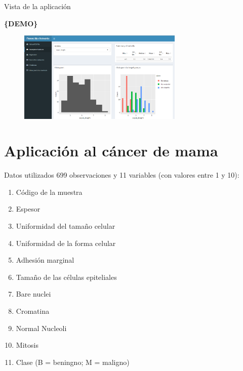 \documentclass[hyperref={unicode}]{beamer}
\begin{document}
\begin{frame}{Vista de la aplicación}
	\begin{center}
	\Huge \color{ExecusharesBlue}\textbf{\{DEMO\}}
	\end{center}
	\begin{figure}[htbp!]
		\centering
		\href{https://parencliticnetworks.shinyapps.io/ParencliticsNetworks}{\includegraphics[width=0.7\textwidth]{../memoria/imagenes/descriptiva.png}}
		\label{fig:aplicacion}
	\end{figure}
\end{frame}



\section{Aplicación al cáncer de mama}
\begin{frame}{Datos utilizados}
	699 observaciones y 11 variables (con valores entre 1 y 10):
	\begin{enumerate}
		\item Código de la muestra
		\item Espesor
		\item Uniformidad del tamaño celular
		\item Uniformidad de la forma celular
		\item Adhesión marginal
		\item Tamaño de las células epiteliales
		\item Bare nuclei
		\item Cromatina
		\item Normal Nucleoli
		\item Mitosis
		\item Clase (B = beningno; M = maligno)
	\end{enumerate}
\end{frame}
\end{document}
